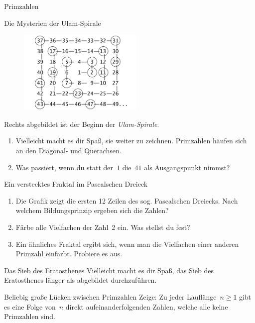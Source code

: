 \documentclass{uebblatt}
\begin{document}
\begin{blatt}{Primzahlen}

\begin{aufgabe}{Die Mysterien der Ulam-Spirale}
\begin{figure}
\vspace*{-1.5cm}
\includegraphics[width=6cm]{ulam}
\end{figure}
Rechts abgebildet ist der Beginn der \emph{Ulam-Spirale}. 
\begin{enumerate}
\item Vielleicht macht es dir Spaß, sie weiter zu zeichnen. Primzahlen häufen
sich an den Diagonal- und Querachsen.
\item Was passiert, wenn du statt der~$1$ die~$41$ als Ausgangspunkt nimmst?
\end{enumerate}
\end{aufgabe}

\begin{aufgabe}{Ein verstecktes Fraktal im Pascalschen Dreieck}
\begin{enumerate}
\item Die Grafik zeigt die ersten 12 Zeilen des sog. Pascalschen Dreiecks. Nach
welchem Bildungsprinzip ergeben sich die Zahlen?
\item Färbe alle Vielfachen der Zahl~2 ein. Was stellst du fest?
\item Ein ähnliches Fraktal ergibt sich, wenn man die Vielfachen einer anderen
Primzahl einfärbt. Probiere es aus.
\end{enumerate}
\centering\pascaltriangle
\end{aufgabe}

\enlargethispage{2em}
\begin{aufgabe}{Das Sieb des Eratosthenes}
Vielleicht macht es dir Spaß, das Sieb des Eratosthenes länger als
abgebildet durchzuführen.
\smallskip

\centering
{}
\end{aufgabe}

\begin{aufgabe}{Beliebig große Lücken zwischen Primzahlen}
Zeige: Zu jeder Lauflänge~$n \geq 1$ gibt es eine Folge von~$n$ direkt
aufeinanderfolgenden Zahlen, welche alle keine Primzahlen sind.


\end{aufgabe}
\end{blatt}
\end{document}
